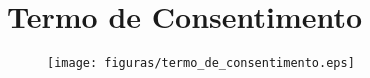 \chapter[Termo de Consentimento]{Termo de Consentimento}

\begin{figure}[H]
	\begin{center}
		\texttt{[image: figuras/termo\_de\_consentimento.eps]}
	\end{center}
\end{figure}